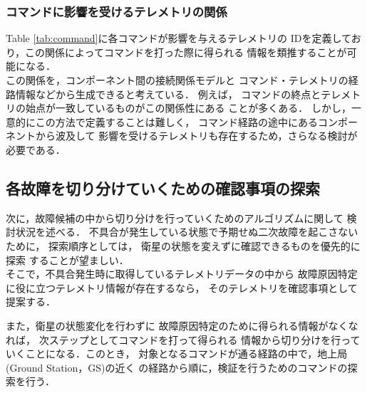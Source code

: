 \documentclass[11pt]{article}
\begin{document}




\subsubsection{コマンドに影響を受けるテレメトリの関係}
Table \ref{tab:command}に各コマンドが影響を与えるテレメトリの
IDを定義しており，この関係によってコマンドを打った際に得られる
情報を類推することが可能になる．\\
この関係を，コンポーネント間の接続関係モデルと
コマンド・テレメトリの経路情報などから生成できると考えている．
例えば，
コマンドの終点とテレメトリの始点が一致しているものがこの関係性にある
ことが多くある．
しかし，一意的にこの方法で定義することは難しく，
コマンド経路の途中にあるコンポーネントから波及して
影響を受けるテレメトリも存在するため，さらなる検討が必要である．


\subsection{各故障を切り分けていくための確認事項の探索}
次に，故障候補の中から切り分けを行っていくためのアルゴリズムに関して
検討状況を述べる．
不具合が発生している状態で予期せぬ二次故障を起こさないために，
探索順序としては，
衛星の状態を変えずに確認できるものを優先的に探索
することが望ましい．\\
そこで，不具合発生時に取得しているテレメトリデータの中から
故障原因特定に役に立つテレメトリ情報が存在するなら，
そのテレメトリを確認事項として提案する．

また，衛星の状態変化を行わずに
故障原因特定のために得られる情報がなくなれば，
次ステップとしてコマンドを打って得られる
情報から切り分けを行っていくことになる．このとき，
対象となるコマンドが通る経路の中で，地上局(Ground Station，GS)の近く
の経路から順に，検証を行うためのコマンドの探索を行う．
\end{document}
